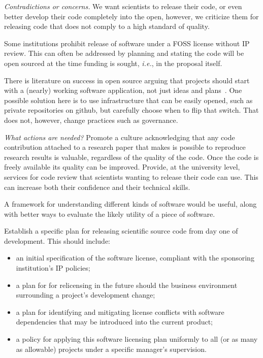 \documentclass[a4paper,UKenglish]{dagman}
\newcommand{\ie}{\emph{i.e.},\xspace}
\begin{document}
\emph{Contradictions or concerns.}
We want scientists to release their code, or even better develop their code completely into the open, however, we criticize them for releasing code that does not comply to a high standard of quality. 

Some institutions prohibit release of software under a FOSS license without IP review. This can often be addressed by planning and stating the code will be open sourced at the time funding is sought, \ie in the proposal itself.

There is literature on success in open source arguing that projects should start with a (nearly) working software application, not just ideas and plans~\cite{senyard2004have}. One possible solution here is to use infrastructure that can be easily opened, such as private repositories on github, but carefully choose when to flip that switch. That does not, however, change practices such as governance.



\emph{What actions are needed?}
Promote a culture acknowledging that any code contribution attached to a research paper that makes is possible to reproduce research results is valuable, regardless of the quality of the code. Once the code is freely available its quality can be improved.
Provide, at the university level, services for code review that scientists wanting to release their code can use. This can increase both their confidence and their technical skills. 

A framework for understanding different kinds of software would be useful, along with better ways to evaluate the likely utility of a piece of software. 

Establish a specific plan for releasing scientific source code from day one of development. This should include:
\begin{itemize}
\item an initial specification of the software license, compliant with the sponsoring institution's IP policies;
\item a plan for for relicensing in the future should the business environment surrounding a project's development change;
\item a plan for identifying and mitigating license conflicts with software dependencies that may be introduced into the current product;
\item a policy for applying this software licensing plan uniformly to all (or as many as allowable) projects under a specific manager's supervision. 
\end{itemize}
\end{document}
